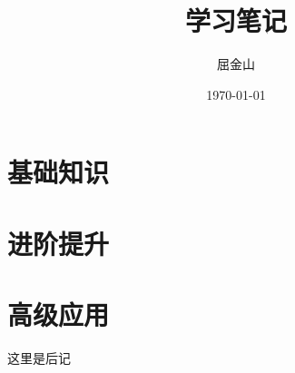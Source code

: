 \documentclass{ctexbook}
\begin{document}
\author{屈金山}
\date{\today}
\title{学习笔记}
\maketitle
\frontmatter

\tableofcontents
\listoffigures
\listoftables
\lstlistoflistings
\mainmatter
\setcounter{page}{1}
\part*{基础知识}



\part*{进阶提升}

\part*{高级应用}


\backmatter
\appendix

这里是后记

\end{document}

